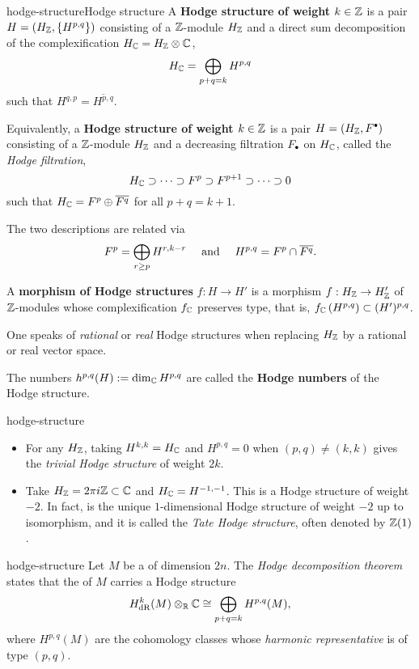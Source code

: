 \begin{topic}{hodge-structure}{Hodge structure}
    A \textbf{Hodge structure of weight $k \in \mathbb{Z}$} is a pair $H = (H_{\mathbb{Z}}, \{ H^{p, q} \})$ consisting of a $\mathbb{Z}$-module $H_{\mathbb{Z}}$ and a direct sum decomposition of the complexification $H_{\mathbb{C}} = H_{\mathbb{Z}} \otimes \mathbb{C}$,
    \[ H_{\mathbb{C}} = \bigoplus_{p + q = k} H^{p, q} \]
    such that $H^{q, p} = \overline{H^{p, q}}$.

    Equivalently, a \textbf{Hodge structure of weight $k \in \mathbb{Z}$} is a pair $H = (H_\ZZ, F^\bdot)$ consisting of a $\mathbb{Z}$-module $H_{\mathbb{Z}}$ and a decreasing filtration $F_\bdot$ on $H_{\mathbb{C}}$, called the \textit{Hodge filtration},
    \[ H_{\mathbb{C}} \supset \cdots \supset F^p \supset F^{p + 1} \supset \cdots \supset 0 \]
    such that $H_{\mathbb{C}} = F^p \oplus \overline{F^q}$ for all $p + q = k + 1$.

    The two descriptions are related via
    \[ F^p = \bigoplus_{r \ge p} H^{r, k - r} \quad \textup{ and } \quad H^{p, q} = F^p \cap \overline{F^q} . \]

    A \textbf{morphism of Hodge structures} $f : H \to H'$ is a morphism $f : H_{\mathbb{Z}} \to H'_{\mathbb{Z}}$ of $\mathbb{Z}$-modules whose complexification $f_{\mathbb{C}}$ preserves type, that is, $f_{\mathbb{C}}\left(H^{p, q}\right) \subset (H')^{p, q}$.
    
    One speaks of \textit{rational} or \textit{real} Hodge structures when replacing $H_{\mathbb{Z}}$ by a rational or real vector space.
        
    The numbers $h^{p, q}(H) := \dim_{\mathbb{C}} H^{p, q}$ are called the \textbf{Hodge numbers} of the Hodge structure.
\end{topic}

\begin{example}{hodge-structure}
    \begin{itemize}
        \item For any $H_{\mathbb{Z}}$, taking $H^{k, k} = H_{\mathbb{C}}$ and $H^{p, q} = 0$ when $(p, q) \ne (k, k)$ gives the \textit{trivial Hodge structure} of weight $2k$.
        \item Take $H_{\mathbb{Z}} = 2 \pi i \mathbb{Z} \subset \mathbb{C}$ and $H_{\mathbb{C}} = H^{-1, -1}$. This is a Hodge structure of weight $-2$. In fact, is the unique $1$-dimensional Hodge structure of weight $-2$ up to isomorphism, and it is called the \textit{Tate Hodge structure}, often denoted by $\mathbb{Z}(1)$.
    \end{itemize}
\end{example}

\begin{example}{hodge-structure}
    Let $M$ be a   of dimension $2n$. The \textit{Hodge decomposition theorem} states that the  of $M$ carries a Hodge structure
    \[ H_\textup{dR}^k(M) \otimes_{\mathbb{R}} \mathbb{C} \cong \bigoplus_{p + q = k} H^{p, q}(M) , \]
    where $H^{p, q}(M)$ are the cohomology classes whose \textit{harmonic representative} is of type $(p, q)$.
\end{example}

